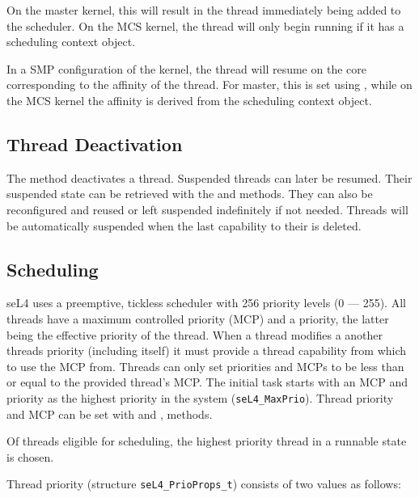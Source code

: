 On the master kernel, this will result in the thread immediately being added to
the scheduler. On the MCS kernel, the thread will only begin running if it has a
scheduling context object.

In a SMP configuration of the kernel, the thread will resume on the core
corresponding to the affinity of the thread. For master, this is set using
, while on the MCS kernel the affinity is
derived from the scheduling context object.

\subsection{Thread Deactivation}
\label{sec:thread_deactivation}

The  method deactivates a thread.
Suspended threads can later be resumed.
Their suspended state can be retrieved with the
 and
 methods.
They can also be reconfigured and
reused or left suspended indefinitely if not needed. Threads will be
automatically suspended when the last capability to their  is
deleted.

\subsection{Scheduling}
\label{sec:sched}

seL4 uses a preemptive, tickless scheduler with 256 priority levels (0 --- 255).  All threads have
a maximum controlled priority (MCP) and a priority, the latter being the effective priority of the
thread.
When a thread modifies a another threads priority (including itself) it must provide a
thread capability from which to use the MCP from. Threads can only set priorities and MCPs
to be less than or equal to the provided thread's MCP.
The initial task starts with an MCP and priority as the highest priority in the system (\texttt{seL4\_MaxPrio}).
Thread priority and MCP can be
set with  and
,
 methods.


Of threads eligible for scheduling, the highest priority thread in a runnable state is chosen.

Thread priority (structure \texttt{seL4\_PrioProps\_t}) consists of two values as follows:

